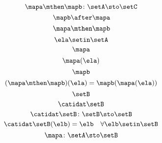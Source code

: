 {\begin{forslides}
        \begin{equation}
            \label{eq:slides_session2_133}
            \mapa \mthen \mapb \colon \setA \sto \setC
        \end{equation}
        \begin{equation}
            \label{eq:slides_session2_134}
            \mapb \after \mapa
        \end{equation}
        \begin{equation}
            \label{eq:slides_session2_135}
            \mapa \mthen \mapb
        \end{equation}
        \begin{equation}
            \label{eq:slides_session2_136}
            \ela \setin\setA
        \end{equation}
        \begin{equation}
            \label{eq:slides_session2_137}
            \mapa
        \end{equation}
        \begin{equation}
            \label{eq:slides_session2_138}
            \mapa(\ela)
        \end{equation}
        \begin{equation}
            \label{eq:slides_session2_139}
            \mapb
        \end{equation}
        \begin{equation}
            \label{eq:slides_session2_140}
            (\mapa \mthen \mapb)(\ela) = \mapb(\mapa(\ela))
        \end{equation}
        \begin{equation}
            \label{eq:slides_session2_141}
            \setB
        \end{equation}
        \begin{equation}
            \label{eq:slides_session2_142}
            \catidat\setB
        \end{equation}
        \begin{equation}
            \label{eq:slides_session2_142a}
            \catidat\setB \colon \setB \sto \setB
        \end{equation}
        \begin{equation}
            \label{eq:slides_session2_143}
            \catidat\setB(\elb) = \elb \quad \forall  \elb \setin\setB
        \end{equation}
        \begin{equation}
            \label{eq:slides_session2_144}
            \mapa \colon \setA \sto \setB

\end{equation}
\end{forslides}}
